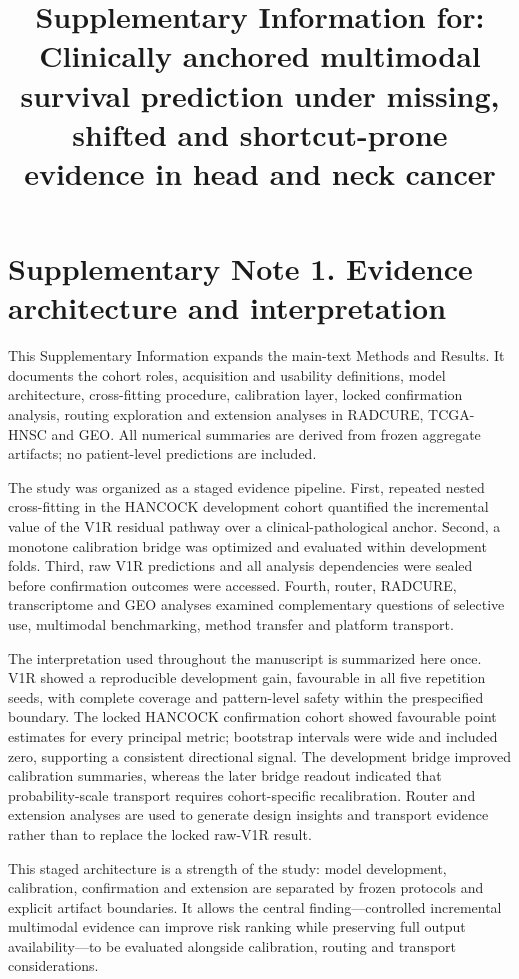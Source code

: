 \documentclass[pdflatex,sn-nature]{sn-jnl}
\begin{document}
\title[Supplementary Information for PATTERN-Surv-HN]{Supplementary Information for: Clinically anchored multimodal survival prediction under missing, shifted and shortcut-prone evidence in head and neck cancer}
\maketitle

\section*{Supplementary Note 1. Evidence architecture and interpretation}

This Supplementary Information expands the main-text Methods and Results. It documents the cohort roles, acquisition and usability definitions, model architecture, cross-fitting procedure, calibration layer, locked confirmation analysis, routing exploration and extension analyses in RADCURE, TCGA-HNSC and GEO. All numerical summaries are derived from frozen aggregate artifacts; no patient-level predictions are included.

The study was organized as a staged evidence pipeline. First, repeated nested cross-fitting in the HANCOCK development cohort quantified the incremental value of the V1R residual pathway over a clinical-pathological anchor. Second, a monotone calibration bridge was optimized and evaluated within development folds. Third, raw V1R predictions and all analysis dependencies were sealed before confirmation outcomes were accessed. Fourth, router, RADCURE, transcriptome and GEO analyses examined complementary questions of selective use, multimodal benchmarking, method transfer and platform transport.

The interpretation used throughout the manuscript is summarized here once. V1R showed a reproducible development gain, favourable in all five repetition seeds, with complete coverage and pattern-level safety within the prespecified boundary. The locked HANCOCK confirmation cohort showed favourable point estimates for every principal metric; bootstrap intervals were wide and included zero, supporting a consistent directional signal. The development bridge improved calibration summaries, whereas the later bridge readout indicated that probability-scale transport requires cohort-specific recalibration. Router and extension analyses are used to generate design insights and transport evidence rather than to replace the locked raw-V1R result.

This staged architecture is a strength of the study: model development, calibration, confirmation and extension are separated by frozen protocols and explicit artifact boundaries. It allows the central finding---controlled incremental multimodal evidence can improve risk ranking while preserving full output availability---to be evaluated alongside calibration, routing and transport considerations.
\end{document}
